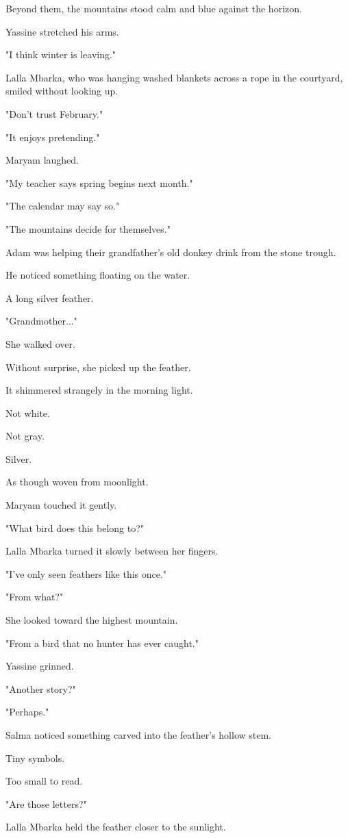 \documentclass[12pt,openany]{book}
\begin{document}
Beyond them, the mountains stood calm and blue against the horizon.

Yassine stretched his arms.

"I think winter is leaving."

Lalla Mbarka, who was hanging washed blankets across a rope in the courtyard, smiled without looking up.

"Don't trust February."

"It enjoys pretending."

Maryam laughed.

"My teacher says spring begins next month."

"The calendar may say so."

"The mountains decide for themselves."

Adam was helping their grandfather's old donkey drink from the stone trough.

He noticed something floating on the water.

A long silver feather.

"Grandmother..."

She walked over.

Without surprise, she picked up the feather.

It shimmered strangely in the morning light.

Not white.

Not gray.

Silver.

As though woven from moonlight.

Maryam touched it gently.

"What bird does this belong to?"

Lalla Mbarka turned it slowly between her fingers.

"I've only seen feathers like this once."

"From what?"

She looked toward the highest mountain.

"From a bird that no hunter has ever caught."

Yassine grinned.

"Another story?"

"Perhaps."

Salma noticed something carved into the feather's hollow stem.

Tiny symbols.

Too small to read.

"Are those letters?"

Lalla Mbarka held the feather closer to the sunlight.
\end{document}
